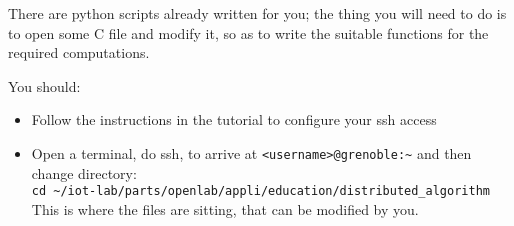 \documentclass{article}
\begin{document}
There are python scripts already written for you; the thing you will need to do
is to open some C file and modify it, so as to write the suitable functions for
the required computations. 

You should:
\begin{itemize}
\item Follow the instructions in the tutorial to configure your ssh access
\item Open a  terminal,  do ssh, to arrive at \verb=<username>@grenoble:~= and then change directory:\\
\verb=cd ~/iot-lab/parts/openlab/appli/education/distributed_algorithm= \\
This is where the files are sitting, that can be modified by you.\\


\end{itemize}
\end{document}
